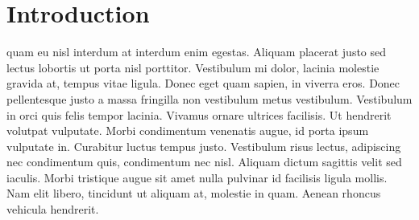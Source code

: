 \chapter{Introduction}
\label{ch:intro}

 quam eu nisl interdum at interdum enim egestas. Aliquam placerat justo sed lectus
lobortis ut porta nisl porttitor. Vestibulum mi dolor, lacinia molestie gravida
at, tempus vitae ligula. Donec eget quam sapien, in viverra eros. Donec
pellentesque justo a massa fringilla non vestibulum metus vestibulum.
Vestibulum in orci quis felis tempor lacinia. Vivamus ornare ultrices
facilisis. Ut hendrerit volutpat vulputate. Morbi condimentum venenatis augue,
id porta ipsum vulputate in. Curabitur luctus tempus justo. Vestibulum risus
lectus, adipiscing nec condimentum quis, condimentum nec nisl. Aliquam dictum
sagittis velit sed iaculis. Morbi tristique augue sit amet nulla pulvinar id
facilisis ligula mollis. Nam elit libero, tincidunt ut aliquam at, molestie in
quam. Aenean rhoncus vehicula hendrerit.
